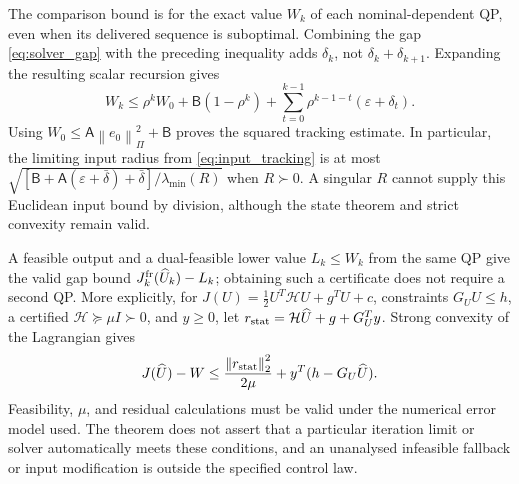 \documentclass[journal]{IEEEtran}
\newcommand{\norm}[1]{\left\lVert #1\right\rVert}
\begin{document}
The comparison bound is for the exact value $W_k$ of each nominal-dependent QP, even when its delivered sequence is suboptimal. Combining the gap \eqref{eq:solver_gap} with the preceding inequality adds $\delta_k$, not $\delta_k+\delta_{k+1}$. Expanding the resulting scalar recursion gives
\begin{equation*}
W_k\le\rho^kW_0+\mathsf B(1-\rho^k)
+\sum_{t=0}^{k-1}\rho^{k-1-t}(\varepsilon+\delta_t).
\end{equation*}
Using $W_0\le\mathsf A\norm{e_0}_\Pi^2+\mathsf B$ proves the squared tracking estimate. In particular, the limiting input radius from \eqref{eq:input_tracking} is at most $\sqrt{[\mathsf B+\mathsf A(\varepsilon+\bar\delta)+\bar\delta]/\lambda_{\min}(R)}$ when $R\succ0$. A singular $R$ cannot supply this Euclidean input bound by division, although the state theorem and strict convexity remain valid.

A feasible output and a dual-feasible lower value $L_k\le W_k$ from the same QP give the valid gap bound $J_k^{\rm fr}(\widehat U_k)-L_k$; obtaining such a certificate does not require a second QP. More explicitly, for $J(U)=\tfrac12U^T\mathcal HU+g^TU+c$, constraints $G_UU\le h$, a certified $\mathcal H\succeq\mu I\succ0$, and $y\ge0$, let $r_{\rm stat}=\mathcal H\widehat U+g+G_U^Ty$. Strong convexity of the Lagrangian gives
\begin{equation*}
J(\widehat U)-W\le\frac{\norm{r_{\rm stat}}_2^2}{2\mu}
+y^T(h-G_U\widehat U).
\end{equation*}
Feasibility, $\mu$, and residual calculations must be valid under the numerical error model used. The theorem does not assert that a particular iteration limit or solver automatically meets these conditions, and an unanalysed infeasible fallback or input modification is outside the specified control law.
\end{document}
